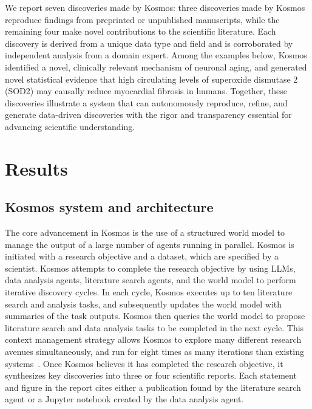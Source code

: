 \documentclass{article}
\begin{document}
We report seven discoveries made by Kosmos: three discoveries made by Kosmos reproduce findings from preprinted or unpublished manuscripts, while the remaining four make novel contributions to the scientific literature. Each discovery is derived from a unique data type and field and is corroborated by independent analysis from a domain expert. Among the examples below, Kosmos identified a novel, clinically relevant mechanism of neuronal aging, and generated novel statistical evidence that high circulating levels of superoxide dismutase 2 (SOD2) may causally reduce myocardial fibrosis in humans. Together, these discoveries illustrate a system that can autonomously reproduce, refine, and generate data-driven discoveries with the rigor and transparency essential for advancing scientific understanding. 


\section{Results}

\subsection{Kosmos system and architecture}

The core advancement in Kosmos is the use of a structured world model to manage the output of a large number of agents running in parallel. Kosmos is initiated with a research objective and a dataset, which are specified by a scientist. Kosmos attempts to complete the research objective by using LLMs, data analysis agents, literature search agents, and the world model to perform iterative discovery cycles. In each cycle, Kosmos executes up to ten literature search and analysis tasks, and subsequently updates the world model with summaries of the task outputs. Kosmos then queries the world model to propose literature search and data analysis tasks to be completed in the next cycle. This context management strategy allows Kosmos to explore many different research avenues simultaneously, and run for eight times as many iterations than existing systems~\cite{ghareeb_robin_2025, lu_ai_2024, zou_agente_2025}. Once Kosmos believes it has completed the research objective, it synthesizes key discoveries into three or four scientific reports. Each statement and figure in the report cites either a publication found by the literature search agent or a Jupyter notebook created by the data analysis agent. 
\end{document}
